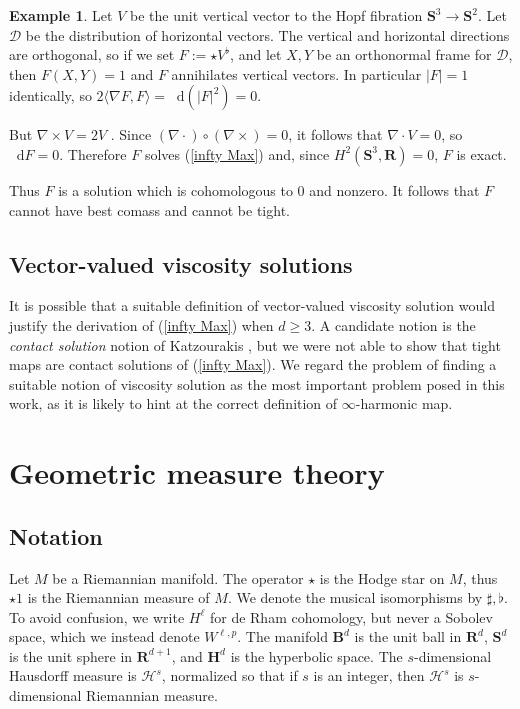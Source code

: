 \documentclass[reqno,11pt]{amsart}
\newcommand{\RR}{\mathbf{R}}
\newcommand{\Hyp}{\mathbf H}
\newcommand{\Sph}{\mathbf S}
\newcommand{\Ball}{\mathbf{B}}
\newcommand*\dif{\mathop{}\!\mathrm{d}}
\newcommand{\dfn}[1]{\emph{#1}\index{#1}}
\theoremstyle{definition}
\newtheorem{example}[theorem]{Example}
\numberwithin{equation}{section}
\begin{document}
\begin{example}\label{integrability needed}
Let $V$ be the unit vertical vector to the Hopf fibration $\Sph^3 \to \Sph^2$.
Let $\mathscr D$ be the distribution of horizontal vectors.
The vertical and horizontal directions are orthogonal, so if we set $F := \star V^\flat$, and let $X, Y$ be an orthonormal frame for $\mathscr D$, then $F(X, Y) = 1$ and $F$ annihilates vertical vectors.
In particular $|F| = 1$ identically, so $2\langle \nabla F, F\rangle = \dif(|F|^2) = 0$.

But $\nabla \times V = 2V$ \cite[\S3]{Peralta_Salas_2023}.
Since $(\nabla \cdot) \circ (\nabla \times) = 0$, it follows that $\nabla \cdot V = 0$, so $\dif F = 0$.
Therefore $F$ solves (\ref{infty Max}) and, since $H^2(\Sph^3, \RR) = 0$, $F$ is exact.

Thus $F$ is a solution which is cohomologous to $0$ and nonzero.
It follows that $F$ cannot have best comass and cannot be tight.
\end{example}

\subsection{Vector-valued viscosity solutions}
It is possible that a suitable definition of vector-valued viscosity solution would justify the derivation of (\ref{infty Max}) when $d \geq 3$.
A candidate notion is the \dfn{contact solution} notion of Katzourakis \cite{Katzourakis2018OnAV}, but we were not able to show that tight maps are contact solutions of (\ref{infty Max}).
We regard the problem of finding a suitable notion of viscosity solution as the most important problem posed in this work, as it is likely to hint at the correct definition of $\infty$-harmonic map.


\appendix
\section{Geometric measure theory}\label{GMT appendix}
\subsection{Notation}
Let $M$ be a Riemannian manifold.
The operator $\star$ is the Hodge star on $M$, thus $\star 1$ is the Riemannian measure of $M$.
We denote the musical isomorphisms by $\sharp, \flat$.
To avoid confusion, we write $H^\ell$ for de Rham cohomology, but never a Sobolev space, which we instead denote $W^{\ell, p}$.
The manifold $\Ball^d$ is the unit ball in $\RR^d$, $\Sph^d$ is the unit sphere in $\RR^{d + 1}$, and $\Hyp^d$ is the hyperbolic space.
The $s$-dimensional Hausdorff measure is $\mathcal H^s$, normalized so that if $s$ is an integer, then $\mathcal H^s$ is $s$-dimensional Riemannian measure.
\end{document}
